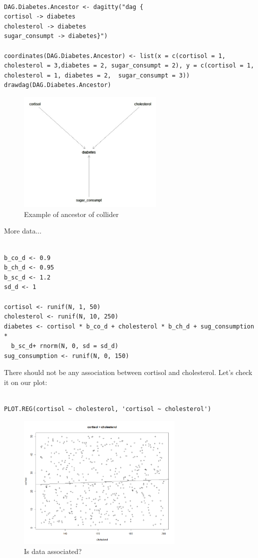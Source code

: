 \documentclass{article}
\begin{document}
\begin{lstlisting}

DAG.Diabetes.Ancestor <- dagitty("dag {
cortisol -> diabetes
cholesterol -> diabetes
sugar_consumpt -> diabetes}")

coordinates(DAG.Diabetes.Ancestor) <- list(x = c(cortisol = 1, cholesterol = 3,diabetes = 2, sugar_consumpt = 2), y = c(cortisol = 1, cholesterol = 1, diabetes = 2,  sugar_consumpt = 3))
drawdag(DAG.Diabetes.Ancestor)

\end{lstlisting}

\begin{figure}[h]
\caption{Example of ancestor of collider}
\includegraphics[width=7cm]{DAG_DIAB_ANCESTOR.png}
\centering
\end{figure}

More data...\par

\begin{lstlisting}

b_co_d <- 0.9
b_ch_d <- 0.95
b_sc_d <- 1.2
sd_d <- 1

cortisol <- runif(N, 1, 50)
cholesterol <- runif(N, 10, 250)
diabetes <- cortisol * b_co_d + cholesterol * b_ch_d + sug_consumption * 
  b_sc_d+ rnorm(N, 0, sd = sd_d)
sug_consumption <- runif(N, 0, 150)
\end{lstlisting}

There should not be any association between cortisol and cholesterol. Let's check it on our plot:\par

\begin{lstlisting}

PLOT.REG(cortisol ~ cholesterol, 'cortisol ~ cholesterol')

\end{lstlisting}

\begin{figure}[h]
\caption{Is data associated?}
\includegraphics[width=8cm]{PLOT_CORT_CHOL.png}
\centering
\end{figure}
\end{document}
